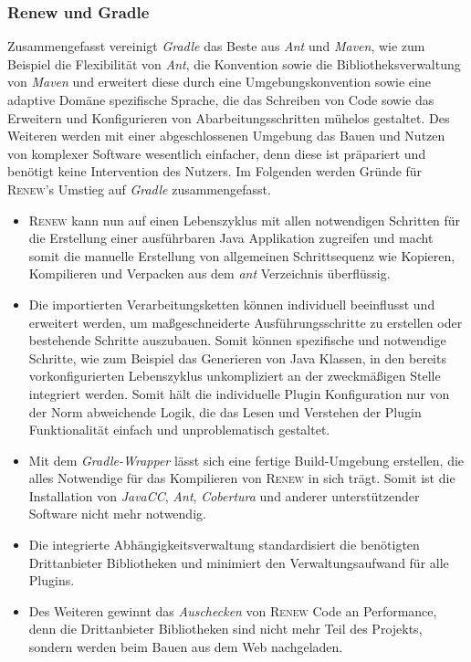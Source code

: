 		\subsubsection{Renew und Gradle}
		Zusammengefasst vereinigt \textit{Gradle} das Beste aus \textit{Ant} und \textit{Maven}, wie zum Beispiel die Flexibilität von \textit{Ant}, die Konvention sowie die Bibliotheksverwaltung von \textit{Maven} und erweitert diese durch eine Umgebungskonvention sowie eine adaptive Domäne spezifische Sprache, die das Schreiben von Code sowie das Erweitern und Konfigurieren von Abarbeitungsschritten mühelos gestaltet. Des Weiteren werden mit einer abgeschlossenen Umgebung das Bauen und Nutzen von komplexer Software wesentlich einfacher, denn diese ist präpariert und benötigt keine Intervention des Nutzers. \newline
		Im Folgenden werden Gründe für \textsc{Renew}'s Umstieg auf \textit{Gradle} zusammengefasst.\bigbreak
		\begin{itemize}
			\item \textsc{Renew} kann nun auf einen Lebenszyklus mit allen notwendigen Schritten für die Erstellung einer ausführbaren Java Applikation zugreifen und macht somit die manuelle Erstellung von allgemeinen Schrittsequenz wie Kopieren, Kompilieren und Verpacken aus dem \textit{ant} Verzeichnis überflüssig. 
			\item Die importierten Verarbeitungsketten können individuell beeinflusst und erweitert werden, um maßgeschneiderte Ausführungsschritte zu erstellen oder bestehende Schritte auszubauen. Somit können spezifische und notwendige Schritte, wie zum Beispiel das Generieren von Java Klassen, in den bereits vorkonfigurierten Lebenszyklus unkompliziert an der zweckmäßigen Stelle integriert werden. Somit hält die individuelle Plugin Konfiguration nur von der Norm abweichende Logik, die das Lesen und Verstehen der Plugin Funktionalität einfach und unproblematisch gestaltet. 
			\item Mit dem \textit{Gradle-Wrapper} lässt sich eine fertige Build-Umgebung erstellen, die alles Notwendige für das Kompilieren von \textsc{Renew} in sich trägt. Somit ist die Installation von \textit{JavaCC}, \textit{Ant}, \textit{Cobertura} und anderer unterstützender Software nicht mehr notwendig.
			\item Die integrierte Abhängigkeitsverwaltung standardisiert die benötigten Drittanbieter Bibliotheken und minimiert den Verwaltungsaufwand für alle Plugins. 
			\item Des Weiteren gewinnt das \textit{Auschecken} von \textsc{Renew} Code an Performance, denn die Drittanbieter Bibliotheken sind nicht mehr Teil des Projekts, sondern werden beim Bauen aus dem Web nachgeladen.
		\end{itemize}
